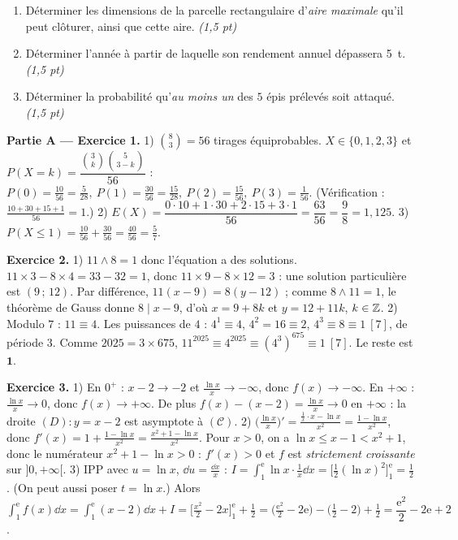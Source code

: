 \begin{enumerate}[label=\textbf{Tâche \arabic*.},leftmargin=2.4em]
\item Déterminer les dimensions de la parcelle rectangulaire d'\emph{aire maximale} qu'il
peut clôturer, ainsi que cette aire. \hfill\textit{(1,5 pt)}
\item Déterminer l'année à partir de laquelle son rendement annuel dépassera \SI{5}{\tonne}. \hfill\textit{(1,5 pt)}
\item Déterminer la probabilité qu'\emph{au moins un} des $5$ épis prélevés soit attaqué. \hfill\textit{(1,5 pt)}
\end{enumerate}
\par{}


\noindent\textbf{Partie A — Exercice 1.}
1) $\binom{8}{3}=56$ tirages équiprobables. $X\in\{0,1,2,3\}$ et
$P(X{=}k)=\dfrac{\binom3k\binom5{3-k}}{56}$ :
$P(0)=\frac{10}{56}=\frac5{28},\ P(1)=\frac{30}{56}=\frac{15}{28},\ P(2)=\frac{15}{56},\ P(3)=\frac1{56}$.
(Vérification : $\frac{10+30+15+1}{56}=1$.)
2) $E(X)=\dfrac{0\cdot10+1\cdot30+2\cdot15+3\cdot1}{56}=\dfrac{63}{56}=\dfrac98=1{,}125$.
3) $P(X\le1)=\frac{10}{56}+\frac{30}{56}=\frac{40}{56}=\frac57$.

\noindent\textbf{Exercice 2.}
1) $11\wedge8=1$ donc l'équation a des solutions. $11\times3-8\times4=33-32=1$, donc
$11\times9-8\times12=3$ : une solution particulière est $(9\,;\,12)$. Par différence,
$11(x-9)=8(y-12)$ ; comme $8\wedge11=1$, le théorème de Gauss donne $8\mid x-9$, d'où
$x=9+8k$ et $y=12+11k$, $k\in\mathbb{Z}$.
2) Modulo $7$ : $11\equiv4$. Les puissances de $4$ : $4^1\equiv4$, $4^2=16\equiv2$,
$4^3\equiv8\equiv1\ [7]$, de période $3$. Comme $2025=3\times675$,
$11^{2025}\equiv4^{2025}\equiv(4^3)^{675}\equiv1\ [7]$. Le reste est $\mathbf{1}$.

\noindent\textbf{Exercice 3.}
1) En $0^+$ : $x-2\to-2$ et $\frac{\ln x}{x}\to-\infty$, donc $f(x)\to-\infty$.
En $+\infty$ : $\frac{\ln x}{x}\to0$, donc $f(x)\to+\infty$. De plus
$f(x)-(x-2)=\frac{\ln x}{x}\to0$ en $+\infty$ : la droite $(D):y=x-2$ est asymptote à $(\mathcal{C})$.
2) $\Big(\frac{\ln x}{x}\Big)'=\frac{\frac1x\cdot x-\ln x}{x^2}=\frac{1-\ln x}{x^2}$, donc
$f'(x)=1+\frac{1-\ln x}{x^2}=\frac{x^2+1-\ln x}{x^2}$. Pour $x>0$, on a $\ln x\le x-1<x^2+1$,
donc le numérateur $x^2+1-\ln x>0$ : $f'(x)>0$ et $f$ est \emph{strictement croissante} sur $]0,+\infty[$.
3) IPP avec $u=\ln x$, $\dd u=\frac{\dd x}{x}$ : $I=\int_1^{\mathrm e}\ln x\cdot\frac1x\dd x=\big[\tfrac12(\ln x)^2\big]_1^{\mathrm e}=\tfrac12$.
(On peut aussi poser $t=\ln x$.) Alors
$\int_1^{\mathrm e}f(x)\dd x=\int_1^{\mathrm e}(x-2)\dd x+I=\big[\tfrac{x^2}2-2x\big]_1^{\mathrm e}+\tfrac12
=\big(\tfrac{\mathrm e^2}2-2\mathrm e\big)-\big(\tfrac12-2\big)+\tfrac12=\dfrac{\mathrm e^2}2-2\mathrm e+2$.

